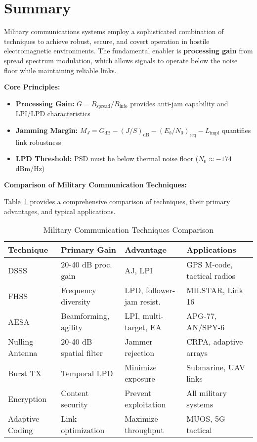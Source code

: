 \section{Summary}

Military communications systems employ a sophisticated combination of techniques to achieve robust, secure, and covert operation in hostile electromagnetic environments. The fundamental enabler is \textbf{processing gain} from spread spectrum modulation, which allows signals to operate below the noise floor while maintaining reliable links.

\textbf{Core Principles:}
\begin{itemize}
\item \textbf{Processing Gain:} $G = B_{\text{spread}}/B_{\text{info}}$ provides anti-jam capability and LPI/LPD characteristics
\item \textbf{Jamming Margin:} $M_J = G_{\text{dB}} - (J/S)_{\text{dB}} - (E_b/N_0)_{\text{req}} - L_{\text{impl}}$ quantifies link robustness
\item \textbf{LPD Threshold:} PSD must be below thermal noise floor ($N_0 \approx -174$ dBm/Hz)
\end{itemize}

\textbf{Comparison of Military Communication Techniques:}

Table~\ref{tab:military-techniques} provides a comprehensive comparison of techniques, their primary advantages, and typical applications.

\begin{table}[h]
\centering
\caption{Military Communication Techniques Comparison}
\label{tab:military-techniques}
\begin{tabular}{llll}
\toprule
\textbf{Technique} & \textbf{Primary Gain} & \textbf{Advantage} & \textbf{Applications} \\
\midrule
DSSS & 20-40 dB proc. gain & AJ, LPI & GPS M-code, tactical radios \\
FHSS & Frequency diversity & LPD, follower-jam resist. & MILSTAR, Link 16 \\
AESA & Beamforming, agility & LPI, multi-target, EA & APG-77, AN/SPY-6 \\
Nulling Antenna & 20-40 dB spatial filter & Jammer rejection & CRPA, adaptive arrays \\
Burst TX & Temporal LPD & Minimize exposure & Submarine, UAV links \\
Encryption & Content security & Prevent exploitation & All military systems \\
Adaptive Coding & Link optimization & Maximize throughput & MUOS, 5G tactical \\
\bottomrule
\end{tabular}
\end{table}

